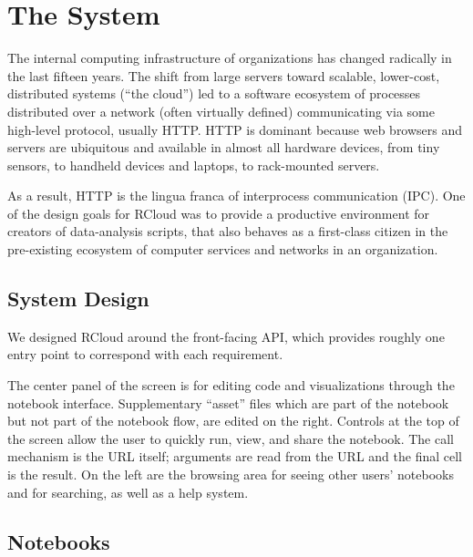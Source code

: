 \section{The System\label{sec:system}}


The internal computing infrastructure of organizations has changed
radically in the last fifteen years. The shift from large
servers toward scalable, lower-cost, distributed systems (``the cloud'')
led to a software ecosystem of processes distributed over a
network (often virtually defined) communicating via some
high-level protocol, usually HTTP. HTTP is dominant because web
browsers and servers are ubiquitous and available in almost
all hardware devices, from tiny sensors, to handheld devices and
laptops, to rack-mounted servers.

As a result, HTTP is the lingua franca of interprocess communication
(IPC). One of the design goals for RCloud was to provide a productive
environment for creators of data-analysis scripts, that also behaves
as a first-class citizen in the pre-existing ecosystem of computer
services and networks in an organization.


\subsection{System Design}

We designed RCloud around the front-facing API, which provides roughly
one entry point to correspond with each requirement.

The center panel of the screen is for editing code and visualizations through
the notebook interface. Supplementary ``asset'' files which are part of the
notebook but not part of the notebook flow, are edited on the right.
Controls at the top of the screen allow the user to quickly run, view, 
and share the notebook. The call mechanism is the URL itself; arguments are
read from the URL and the final cell is the result. On the left are the 
browsing area for seeing other users' notebooks and for searching, as well
as a help system.

\subsection{Notebooks\label{sec:notebooks}}

